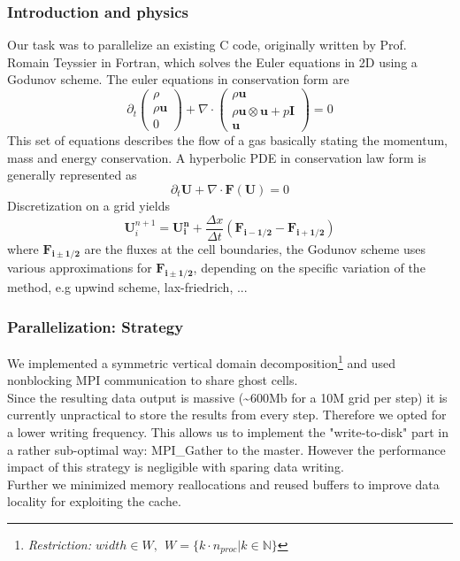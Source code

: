 \documentclass{beamer}
\begin{document}
\begin{frame}
\frametitle{Introduction and physics}
\justify
\small{
Our task was to parallelize an existing C code, originally written by Prof. Romain Teyssier in Fortran, which solves the Euler equations in 2D using a Godunov scheme. The euler equations in conservation form are 
\begin{equation}
\partial_t
\begin{pmatrix} \rho    \\ \rho \mathbf{u}\\0\end{pmatrix}+\nabla\cdot\begin{pmatrix} \rho\mathbf{u}    \\ \rho\mathbf{u}\otimes\mathbf{u}+p\mathbf{I}\\ \mathbf{u}\end{pmatrix} = 0
\end{equation}
This set of equations describes the flow of a gas basically stating the momentum, mass and energy conservation. A hyperbolic PDE in conservation law form is generally represented as
\begin{equation}
\partial_t\mathbf{U} + \nabla\cdot\mathbf{F(U)} = 0
\label{eq:bb}
\end{equation}
Discretization on a grid yields
\begin{equation}
\mathbf{U}^{n+1}_i=\mathbf{U^n_i}+\frac{\Delta x}{\Delta t}(\mathbf{F_{i-1/2}}-\mathbf{F_{i+1/2}})
\label{eq:bc}
\end{equation}
where $\mathbf{F_{i\pm1/2}}$ are the fluxes at the cell boundaries, the Godunov scheme uses various approximations for $\mathbf{F_{i\pm1/2}}$, depending on the specific variation of the method, e.g upwind scheme, lax-friedrich, ... \\
}


\end{frame}

%
%
%
\begin{frame}
\frametitle{Parallelization: Strategy}

We implemented a symmetric vertical domain decomposition\footnote{ 
\emph{Restriction: $width\in W,~~W=\{k\cdot n_{proc}|k\in\mathbb{N}\}$ } } and used nonblocking MPI communication to share ghost cells.\\
\vspace{2mm}
Since the resulting data output is massive (\textasciitilde{}600Mb for a 10M grid per step) it is currently unpractical to store the results from every step. Therefore we opted for a lower writing frequency. This allows us to implement the "write-to-disk" part in a rather sub-optimal way: MPI\_Gather to the master. However the performance impact of this strategy is negligible with sparing data writing.\\
\vspace{2mm}
Further we minimized memory reallocations and reused buffers to improve data locality for exploiting the cache. \\

\end{frame}
\end{document}
